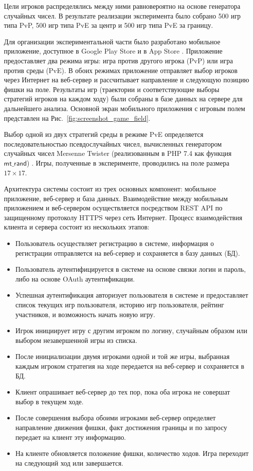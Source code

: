 Цели игроков распределялись между ними равновероятно на основе генератора случайных чисел. В результате реализации эксперимента было собрано 500 игр типа PvP, 500 игр типа PvE за центр и 500 игр типа PvE за границу.

Для организации экспериментальной части было разработано мобильное приложение, доступное в Google Play Store \cite{googleplay} и в App Store \cite{applestore}. Приложение предоставляет два режима игры: игра против другого игрока (PvP) или игра против среды (PvE). В обоих режимах приложение отправляет выбор игроков через Интернет на веб-сервер и рассчитывает направление и следующую позицию фишки на поле. Результаты игр (траектории и соответствующие выборы стратегий игроков на каждом ходу) были собраны в базе данных на сервере для дальнейшего анализа. Основной экран мобильного приложения с игровым полем представлен на Рис.~\cref{fig:screenshot_game_field}.

Выбор одной из двух стратегий среды в режиме PvE определяется последовательностью псевдослучайных чисел, вычисленных генератором случайных чисел Mersenne Twister (реализованным в PHP 7.4 как функция $\mathsf{mt\_rand}$) \cite{matsumoto_mersenne_1998}. Игры, полученные в эксперименте, проводились на поле размера $17 \times 17$.

Архитектура системы состоит из трех основных компонент: мобильное приложение, веб-сервер и база данных. Взаимодействие между мобильным приложением и веб-сервером осуществляется посредством REST API по защищенному протоколу HTTPS через сеть Интернет. Процесс взаимодействия клиента и сервера состоит из нескольких этапов:
\begin{itemize}
\item Пользователь осуществляет регистрацию в системе, информация о регистрации отправляется на веб-сервер и сохраняется в базу данных (БД).
\item Пользователь аутентифицируется в системе на основе связки логин и пароль, либо на основе OAuth аутентификации.
\item Успешная аутентификация авторизует пользователя в системе и предоставляет список текущих игр пользователя, историю игр пользователя, рейтинг участников, и возможность начать новую игру.
\item Игрок инициирует игру с другим игроком по логину, случайным образом или выбором незавершенной игры из списка.
\item После инициализации двумя игроками одной и той же игры, выбранная каждым игроком стратегия на ходе передается на веб-сервер и сохраняется в БД.
\item Клиент опрашивает веб-сервер до тех пор, пока оба игрока не совершат выбор в текущем ходе.
\item После совершения выбора обоими игроками веб-сервер определяет направление движения фишки, факт достижения границы и по запросу передает на клиент эту информацию.
\item На клиенте обновляется положение фишки, количество ходов. Игра переходит на следующий ход или завершается.
\end{itemize}

